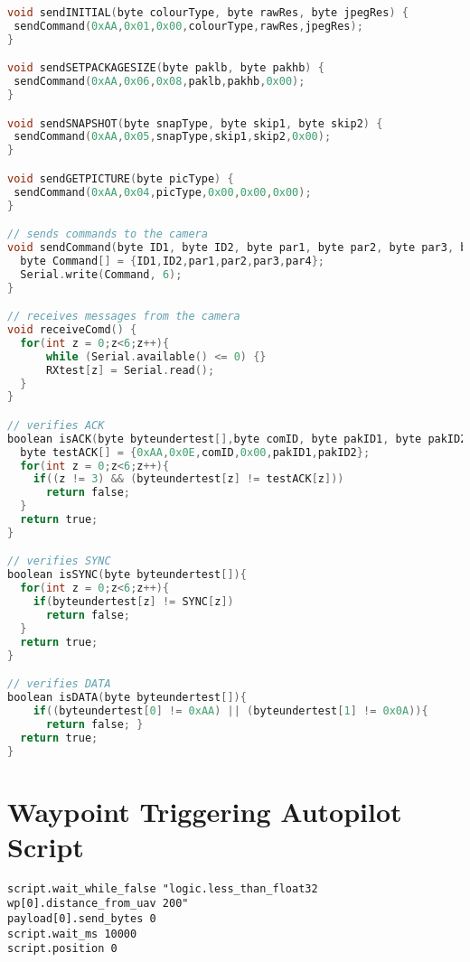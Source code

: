 \begin{lstlisting}[language=C, label = lst:arduino_captureTest, caption = {Arduino code, used up until the point we started using the Il Matto. This was written in the arduino-022 IDE}]
void sendINITIAL(byte colourType, byte rawRes, byte jpegRes) {
 sendCommand(0xAA,0x01,0x00,colourType,rawRes,jpegRes);
}

void sendSETPACKAGESIZE(byte paklb, byte pakhb) {
 sendCommand(0xAA,0x06,0x08,paklb,pakhb,0x00);
}

void sendSNAPSHOT(byte snapType, byte skip1, byte skip2) {
 sendCommand(0xAA,0x05,snapType,skip1,skip2,0x00);
}

void sendGETPICTURE(byte picType) {
 sendCommand(0xAA,0x04,picType,0x00,0x00,0x00);
}

// sends commands to the camera
void sendCommand(byte ID1, byte ID2, byte par1, byte par2, byte par3, byte par4) {
  byte Command[] = {ID1,ID2,par1,par2,par3,par4};
  Serial.write(Command, 6);
}

// receives messages from the camera
void receiveComd() {
  for(int z = 0;z<6;z++){
      while (Serial.available() <= 0) {}
      RXtest[z] = Serial.read();
  }
}

// verifies ACK
boolean isACK(byte byteundertest[],byte comID, byte pakID1, byte pakID2){
  byte testACK[] = {0xAA,0x0E,comID,0x00,pakID1,pakID2};
  for(int z = 0;z<6;z++){
    if((z != 3) && (byteundertest[z] != testACK[z]))
      return false;
  }
  return true;
}

// verifies SYNC
boolean isSYNC(byte byteundertest[]){
  for(int z = 0;z<6;z++){
    if(byteundertest[z] != SYNC[z])
      return false;
  }
  return true;
}

// verifies DATA
boolean isDATA(byte byteundertest[]){
    if((byteundertest[0] != 0xAA) || (byteundertest[1] != 0x0A)){
      return false; }
  return true;
}
\end{lstlisting}

\section{Waypoint Triggering Autopilot Script}

\begin{lstlisting}[label = lst:wp_trigger, caption = {Waypoint triggering code written for the SkyCircuits autopilot. The send\_bytes command is sent when the payload is within 200 meters of waypoint 0. The code will then wait 10 seconds before running again.}]
script.wait_while_false "logic.less_than_float32 wp[0].distance_from_uav 200"
payload[0].send_bytes 0
script.wait_ms 10000
script.position 0
\end{lstlisting}
